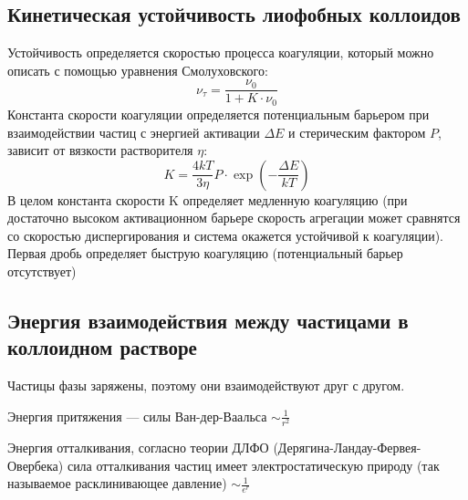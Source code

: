 \documentclass[a4paper,12pt]{article}
\begin{document}
\subsection{Кинетическая устойчивость лиофобных коллоидов}
Устойчивость определяется скоростью процесса коагуляции, который можно описать с помощью уравнения Смолуховского: 
\begin{equation}
    \nu_{\tau} = \frac{\nu_{0}}{1+K \cdot \nu_{0}}
\end{equation}
Константа скорости коагуляции определяется потенциальным барьером при взаимодействии частиц с  энергией активации $\Delta E$  и стерическим фактором $P$, зависит от вязкости растворителя $\eta$:
\begin{equation}
    K = \frac{4kT}{3 \eta} P\cdot \exp  \left(-\frac{\Delta E}{kT} \right)
\end{equation}
В целом константа скорости K определяет медленную коагуляцию (при достаточно высоком активационном барьере скорость агрегации может сравнятся со скоростью диспергирования и система окажется устойчивой к коагуляции). Первая дробь определяет быструю коагуляцию (потенциальный барьер отсутствует)

\subsection{Энергия взаимодействия между частицами в коллоидном растворе}
Частицы фазы заряжены, поэтому они взаимодействуют друг с другом.

Энергия притяжения — силы Ван-дер-Ваальса $ \sim \frac{1}{r^2}$ 

Энергия отталкивания, согласно теории ДЛФО (Дерягина-Ландау-Фервея-Овербека) сила  отталкивания  частиц  имеет 
электростатическую  природу  (так  называемое  расклинивающее  давление) $ \sim \frac{1}{e^r}$ 
\end{document}
